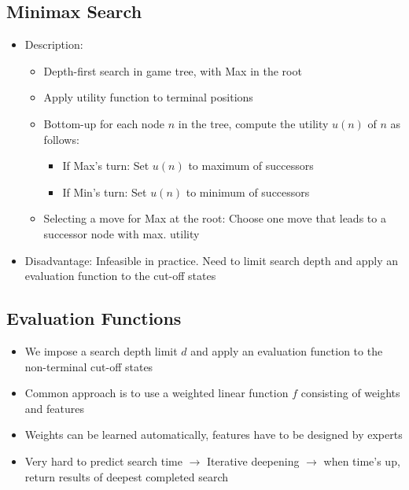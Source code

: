 \documentclass{scrartcl}
\begin{document}
\subsection{Minimax Search}
\begin{itemize}
    \item
        Description:
        \begin{itemize}
            \item
                Depth-first search in game tree, with Max in the root
            \item
                Apply utility function to terminal positions
            \item
                Bottom-up for each node $n$ in the tree, compute the utility $u(n)$ of $n$ as follows:
                \begin{itemize}
                    \item
                        If Max's turn: Set $u(n)$ to maximum of successors
                    \item
                        If Min's turn: Set $u(n)$ to minimum of successors
                \end{itemize}
            \item
                Selecting a move for Max at the root: Choose one move that leads to a successor node with max. utility
        \end{itemize}
    \item
        Disadvantage: Infeasible in practice. Need to limit search depth and apply an evaluation function to the cut-off states
\end{itemize}
\subsection{Evaluation Functions}
\begin{itemize}
    \item
        We impose a search depth limit $d$ and apply an evaluation function to the non-terminal cut-off states 
    \item
        Common approach is to use a weighted linear function $f$ consisting of weights and features
    \item
        Weights can be learned automatically, features have to be designed by experts
    \item
        Very hard to predict search time $\rightarrow$ Iterative deepening $\rightarrow$ when time's up, return results of deepest completed search
\end{itemize}
\end{document}
